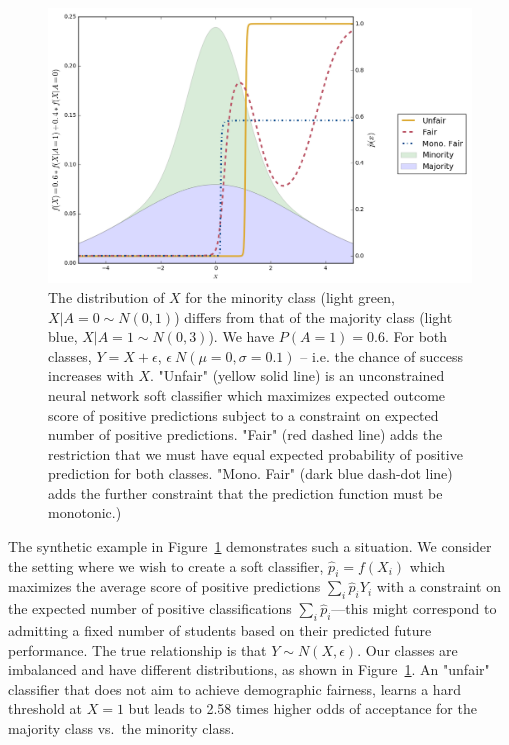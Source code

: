     \begin{figure}[ht]
        \centering
        \includegraphics[width=\textwidth]{fig_monofair/nonmono_1d_example.png}
        \caption{The distribution of $X$ for the minority class (light green, $X|A=0 \sim N(0, 1)$) differs from that of the majority class (light blue, $X|A=1 \sim N(0, 3)$). We have $P(A=1) = 0.6$. For both classes, $Y = X + \epsilon$, $\epsilon ~ N(\mu=0, \sigma=0.1)$  -- i.e. the chance of success increases with $X$. "Unfair" (yellow solid line) is an unconstrained neural network soft classifier which maximizes expected outcome score of positive predictions subject to a constraint on expected number of positive predictions. "Fair" (red dashed line) adds the restriction that we must have equal expected probability of positive prediction for both classes.  "Mono. Fair" (dark blue dash-dot line) adds the further constraint that the prediction function must be monotonic.)}
        \label{fig:nonmono_problem}
    \end{figure}
    
    The synthetic example in Figure~\ref{fig:nonmono_problem} demonstrates such a situation. We consider the setting where we wish to create a soft classifier, $\hat{p}_i = f(X_i)$ which maximizes the average score of positive predictions $\sum_i \hat{p}_i Y_i$ with a constraint on the expected number of positive classifications $\sum_i \hat{p}_i$---this might correspond to admitting a fixed number of students based on their predicted future performance. The true relationship is that $Y \sim  N(X, \epsilon)$. Our classes are imbalanced and have different distributions, as shown in Figure~\ref{fig:nonmono_problem}. An "unfair" classifier that does not aim to achieve demographic fairness, learns a hard threshold at $X=1$ but leads to 2.58 times higher odds of acceptance for the majority class vs.\ the minority class.
        
